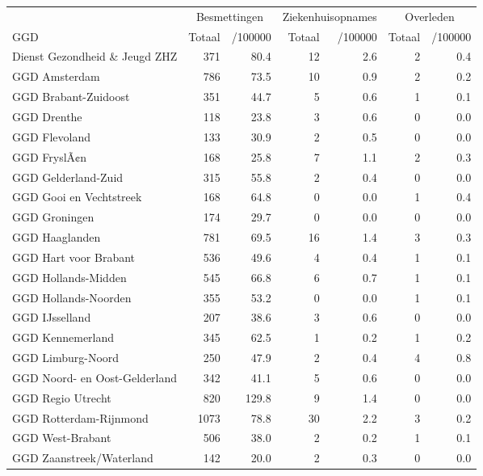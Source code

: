 \documentclass[
  english,
  man,floatsintext]{apa6}
\begin{document}
\begin{table}
\centering\begingroup\fontsize{10}{12}\selectfont

\begin{threeparttable}
\begin{tabular}{lrrrrrr}
\toprule
\multicolumn{1}{c}{ } & \multicolumn{2}{c}{Besmettingen} & \multicolumn{2}{c}{Ziekenhuisopnames} & \multicolumn{2}{c}{Overleden} \\
\cmidrule(l{3pt}r{3pt}){2-3} \cmidrule(l{3pt}r{3pt}){4-5} \cmidrule(l{3pt}r{3pt}){6-7}
GGD & Totaal & /100000 & Totaal & /100000 & Totaal & /100000\\
\midrule
Dienst Gezondheid \& Jeugd ZHZ & 371 & 80.4 & 12 & 2.6 & 2 & 0.4\\
GGD Amsterdam & 786 & 73.5 & 10 & 0.9 & 2 & 0.2\\
GGD Brabant-Zuidoost & 351 & 44.7 & 5 & 0.6 & 1 & 0.1\\
GGD Drenthe & 118 & 23.8 & 3 & 0.6 & 0 & 0.0\\
GGD Flevoland & 133 & 30.9 & 2 & 0.5 & 0 & 0.0\\
GGD FryslÃ¢n & 168 & 25.8 & 7 & 1.1 & 2 & 0.3\\
GGD Gelderland-Zuid & 315 & 55.8 & 2 & 0.4 & 0 & 0.0\\
GGD Gooi en Vechtstreek & 168 & 64.8 & 0 & 0.0 & 1 & 0.4\\
GGD Groningen & 174 & 29.7 & 0 & 0.0 & 0 & 0.0\\
GGD Haaglanden & 781 & 69.5 & 16 & 1.4 & 3 & 0.3\\
GGD Hart voor Brabant & 536 & 49.6 & 4 & 0.4 & 1 & 0.1\\
GGD Hollands-Midden & 545 & 66.8 & 6 & 0.7 & 1 & 0.1\\
GGD Hollands-Noorden & 355 & 53.2 & 0 & 0.0 & 1 & 0.1\\
GGD IJsselland & 207 & 38.6 & 3 & 0.6 & 0 & 0.0\\
GGD Kennemerland & 345 & 62.5 & 1 & 0.2 & 1 & 0.2\\
GGD Limburg-Noord & 250 & 47.9 & 2 & 0.4 & 4 & 0.8\\
GGD Noord- en Oost-Gelderland & 342 & 41.1 & 5 & 0.6 & 0 & 0.0\\
GGD Regio Utrecht & 820 & 129.8 & 9 & 1.4 & 0 & 0.0\\
GGD Rotterdam-Rijnmond & 1073 & 78.8 & 30 & 2.2 & 3 & 0.2\\
GGD West-Brabant & 506 & 38.0 & 2 & 0.2 & 1 & 0.1\\
GGD Zaanstreek/Waterland & 142 & 20.0 & 2 & 0.3 & 0 & 0.0\\

\end{tabular}
\end{threeparttable}
\end{table}
\end{document}
